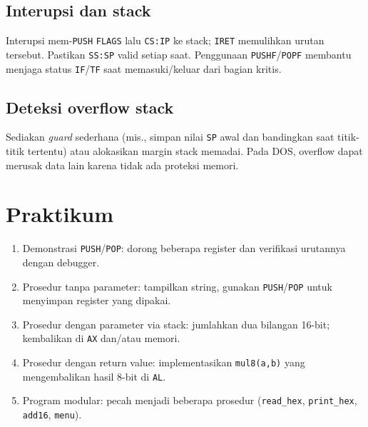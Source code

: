 \subsection{Interupsi dan stack}
Interupsi mem-\texttt{PUSH} \texttt{FLAGS} lalu \texttt{CS:IP} ke stack; \texttt{IRET} memulihkan urutan tersebut. Pastikan \texttt{SS:SP} valid setiap saat. Penggunaan \texttt{PUSHF}/\texttt{POPF} membantu menjaga status \texttt{IF}/\texttt{TF} saat memasuki/keluar dari bagian kritis. \cite{rbil}

\subsection{Deteksi overflow stack}
Sediakan \textit{guard} sederhana (mis., simpan nilai \texttt{SP} awal dan bandingkan saat titik-titik tertentu) atau alokasikan margin stack memadai. Pada DOS, overflow dapat merusak data lain karena tidak ada proteksi memori. \cite{osdev_wiki}

\section{Praktikum}
\begin{enumerate}
  \item Demonstrasi \texttt{PUSH}/\texttt{POP}: dorong beberapa register dan verifikasi urutannya dengan debugger.
  \item Prosedur tanpa parameter: tampilkan string, gunakan \texttt{PUSH}/\texttt{POP} untuk menyimpan register yang dipakai.
  \item Prosedur dengan parameter via stack: jumlahkan dua bilangan 16-bit; kembalikan di \texttt{AX} dan/atau memori.
  \item Prosedur dengan return value: implementasikan \texttt{mul8(a,b)} yang mengembalikan hasil 8-bit di \texttt{AL}.
  \item Program modular: pecah menjadi beberapa prosedur (\texttt{read\_hex}, \texttt{print\_hex}, \texttt{add16}, \texttt{menu}).
\end{enumerate}

